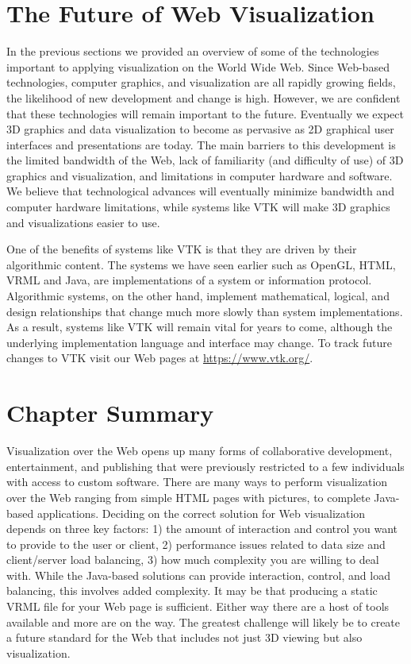 \section{The Future of Web Visualization}

In the previous sections we provided an overview of some of the technologies important to applying visualization on the World Wide Web. Since Web-based technologies, computer graphics, and visualization are all rapidly growing fields, the likelihood of new development and change is high. However, we are confident that these technologies will remain important to the future. Eventually we expect 3D graphics and data visualization to become as pervasive as 2D graphical user interfaces and presentations are today. The main barriers to this development is the limited bandwidth of the Web, lack of familiarity (and difficulty of use) of 3D graphics and visualization, and limitations in computer hardware and software. We believe that technological advances will eventually minimize bandwidth and computer hardware limitations, while systems like VTK will make 3D graphics and visualizations easier to use.

One of the benefits of systems like VTK is that they are driven by their algorithmic content. The systems we have seen earlier such as OpenGL, HTML, VRML and Java, are implementations of a system or information protocol. Algorithmic systems, on the other hand, implement mathematical, logical, and design relationships that change much more slowly than system implementations. As a result, systems like VTK will remain vital for years to come, although the underlying implementation language and interface may change. To track future changes to VTK visit our Web pages at \href{https://www.vtk.org/}{https://www.vtk.org/}.

\section{Chapter Summary}

Visualization over the Web opens up many forms of collaborative development, entertainment, and publishing that were previously restricted to a few individuals with access to custom software. There are many ways to perform visualization over the Web ranging from simple HTML pages with pictures, to complete Java-based applications. Deciding on the correct solution for Web visualization depends on three key factors: 1) the amount of interaction and control you want to provide to the user or client, 2) performance issues related to data size and client/server load balancing, 3) how much complexity you are willing to deal with. While the Java-based solutions can provide interaction, control, and load balancing, this involves added complexity. It may be that producing a static VRML file for your Web page is sufficient. Either way there are a host of tools available and more are on the way. The greatest challenge will likely be to create a future standard for the Web that includes not just 3D viewing but also visualization.

